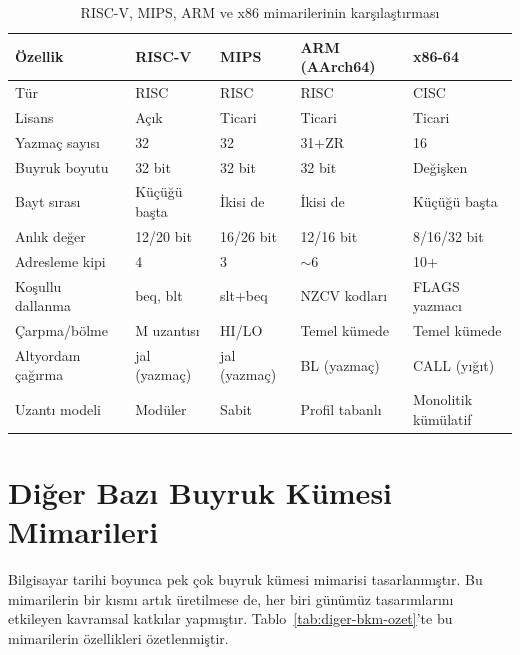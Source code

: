 \begin{table}[H]
\centering
\caption{RISC-V, MIPS, ARM ve x86 mimarilerinin karşılaştırması}
\label{tab:dort-mimari-karsilastirma}
\small
\begin{tabular}{lllll}
\toprule
\textbf{Özellik} & \textbf{RISC-V} & \textbf{MIPS} & \textbf{ARM (AArch64)} & \textbf{x86-64} \\
\midrule
Tür          & RISC       & RISC       & RISC       & CISC \\
Lisans       & Açık       & Ticari     & Ticari     & Ticari \\
Yazmaç sayısı & 32        & 32         & 31+ZR      & 16 \\
Buyruk boyutu & 32 bit    & 32 bit     & 32 bit     & Değişken \\
Bayt sırası  & Küçüğü başta & İkisi de & İkisi de  & Küçüğü başta \\
Anlık değer  & 12/20 bit  & 16/26 bit  & 12/16 bit  & 8/16/32 bit \\
Adresleme kipi & 4          & 3          & $\sim$6    & 10+ \\
Koşullu dallanma & beq, blt  & slt+beq   & NZCV kodları & FLAGS yazmacı \\
Çarpma/bölme & M uzantısı  & HI/LO     & Temel kümede & Temel kümede \\
Altyordam çağırma & jal (yazmaç) & jal (yazmaç) & BL (yazmaç) & CALL (yığıt) \\
Uzantı modeli & Modüler    & Sabit      & Profil tabanlı & Monolitik kümülatif \\
\bottomrule
\end{tabular}
\end{table}


\section{Diğer Bazı Buyruk Kümesi Mimarileri}
\label{sec:diger-bkm}

Bilgisayar tarihi boyunca pek çok buyruk kümesi mimarisi tasarlanmıştır. Bu mimarilerin bir kısmı artık üretilmese de, her biri günümüz tasarımlarını etkileyen kavramsal katkılar yapmıştır. Tablo~\ref{tab:diger-bkm-ozet}'te bu mimarilerin özellikleri özetlenmiştir.

